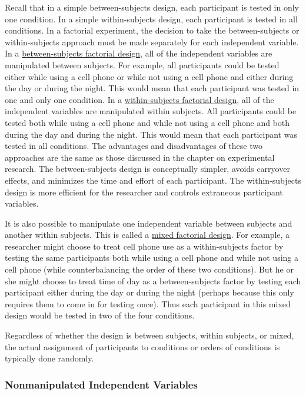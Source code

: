 \documentclass[
]{krantz}
\begin{document}
Recall that in a simple between-subjects design, each participant is tested in only one condition. In a simple within-subjects design, each participant is tested in all conditions. In a factorial experiment, the decision to take the between-subjects or within-subjects approach must be made separately for each independent variable. In a \hyperref[between-subjects-factorial-design]{between-subjects factorial design}, all of the independent variables are manipulated between subjects. For example, all participants could be tested either while using a cell phone or while not using a cell phone and either during the day or during the night. This would mean that each participant was tested in one and only one condition. In a \hyperref[within-subjects-factorial-design]{within-subjects factorial design}, all of the independent variables are manipulated within subjects. All participants could be tested both while using a cell phone and while not using a cell phone and both during the day and during the night. This would mean that each participant was tested in all conditions. The advantages and disadvantages of these two approaches are the same as those discussed in the chapter on experimental research. The between-subjects design is conceptually simpler, avoids carryover effects, and minimizes the time and effort of each participant. The within-subjects design is more efficient for the researcher and controls extraneous participant variables.

It is also possible to manipulate one independent variable between subjects and another within subjects. This is called a \hyperref[mixed-factorial-design]{mixed factorial design}. For example, a researcher might choose to treat cell phone use as a within-subjects factor by testing the same participants both while using a cell phone and while not using a cell phone (while counterbalancing the order of these two conditions). But he or she might choose to treat time of day as a between-subjects factor by testing each participant either during the day or during the night (perhaps because this only requires them to come in for testing once). Thus each participant in this mixed design would be tested in two of the four conditions.

Regardless of whether the design is between subjects, within subjects, or mixed, the actual assignment of participants to conditions or orders of conditions is typically done randomly.

\subsubsection*{Nonmanipulated Independent Variables}\label{nonmanipulated-independent-variables}
\end{document}
